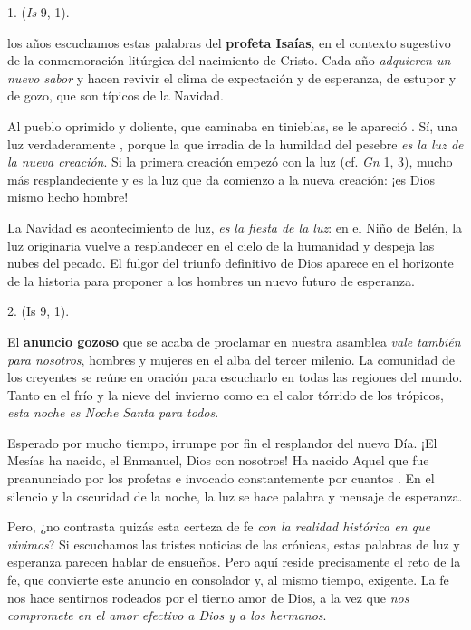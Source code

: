 \begin{body}
	1. \emph{} (\emph{Is} 9, 1).
	
	 los años escuchamos estas palabras del \textbf{profeta Isaías}, en el contexto sugestivo de la conmemoración litúrgica del nacimiento de Cristo. Cada año \emph{adquieren un nuevo sabor} y hacen revivir el clima de expectación y de esperanza, de estupor y de gozo, que son típicos de la Navidad.
	
	Al pueblo oprimido y doliente, que caminaba en tinieblas, se le apareció . Sí, una luz verdaderamente , porque la que irradia de la humildad del pesebre \emph{es la luz de la nueva creación}. Si la primera creación empezó con la luz (cf. \emph{Gn} 1, 3), mucho más resplandeciente y  es la luz que da comienzo a la nueva creación: ¡es Dios mismo hecho hombre!
	
	La Navidad es acontecimiento de luz, \emph{es la fiesta de la luz}: en el Niño de Belén, la luz originaria vuelve a resplandecer en el cielo de la humanidad y despeja las nubes del pecado. El fulgor del triunfo definitivo de Dios aparece en el horizonte de la historia para proponer a los hombres un nuevo futuro de esperanza.
	
	2.  (Is 9, 1).
	
	El \textbf{anuncio gozoso} que se acaba de proclamar en nuestra asamblea \emph{vale también para nosotros}, hombres y mujeres en el alba del tercer milenio. La comunidad de los creyentes se reúne en oración para escucharlo en todas las regiones del mundo. Tanto en el frío y la nieve del invierno como en el calor tórrido de los trópicos, \emph{esta noche es Noche Santa para todos}.
	
	Esperado por mucho tiempo, irrumpe por fin el resplandor del nuevo Día. ¡El Mesías ha nacido, el Enmanuel, Dios con nosotros! Ha nacido Aquel que fue preanunciado por los profetas e invocado constantemente por cuantos . En el silencio y la oscuridad de la noche, la luz se hace palabra y mensaje de esperanza.
	
	Pero, ¿no contrasta quizás esta certeza de fe \emph{con la realidad histórica en que vivimos}? Si escuchamos las tristes noticias de las crónicas, estas palabras de luz y esperanza parecen hablar de ensueños. Pero aquí reside precisamente el reto de la fe, que convierte este anuncio en consolador y, al mismo tiempo, exigente. La fe nos hace sentirnos rodeados por el tierno amor de Dios, a la vez que \emph{nos compromete en el amor efectivo a Dios y a los hermanos}.
	

\end{body}
